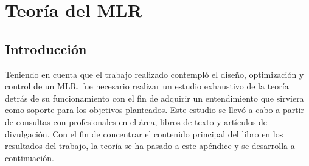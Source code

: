 \chapter{Teoría del MLR}

\section{Introducción}
Teniendo en cuenta que el trabajo realizado contempló el diseño, optimización y control de un MLR, fue necesario realizar un estudio exhaustivo de la teoría detrás de su funcionamiento con el fin de adquirir un entendimiento que sirviera como soporte para los objetivos planteados. Este estudio se llevó a cabo a partir de consultas con profesionales en el área, libros de texto y artículos de divulgación. Con el fin de concentrar el contenido principal del libro en los resultados del trabajo, la teoría se ha pasado a este apéndice y se desarrolla a continuación.

